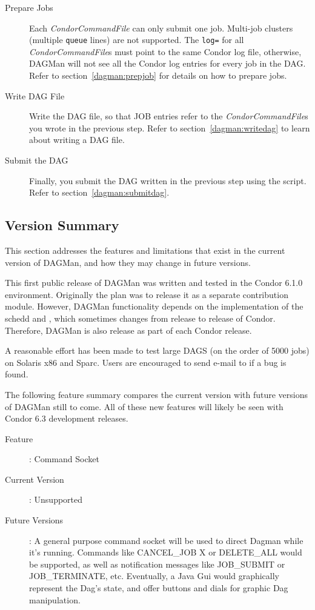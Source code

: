 \begin{description}

\item[Prepare Jobs] 
Each \textit{CondorCommandFile} can only submit one job.
Multi-job clusters (multiple \texttt{queue} lines) are not supported.
The \texttt{log=} for all \textit{CondorCommandFile}s must point to
the same Condor log file, otherwise, DAGMan will not see all the
Condor log entries for every job in the DAG.  
Refer to section~\ref{dagman:prepjob} for details on how to prepare
jobs.

\item[Write DAG File] Write the DAG file, so that JOB entries refer to the
\textit{CondorCommandFile}s you wrote in the previous step.  Refer to
section~\ref{dagman:writedag} to learn about writing a DAG file.

\item[Submit the DAG] Finally, you submit the DAG written in the previous step
using the  script.  Refer to
section~\ref{dagman:submitdag}.

\end{description}


\subsection{\label{dagman:version}Version Summary}

This section addresses the features and limitations that exist in the current
version of DAGMan, and how they may change in future versions.

This first public release of DAGMan was written and tested in the Condor 6.1.0
environment.  Originally the plan was to release it as a separate contribution
module.  However, DAGMan functionality depends on the implementation of the
schedd and , which sometimes changes from release to release of
Condor.  Therefore, DAGMan is also release as part of each Condor release.

A reasonable effort has been made to test large DAGS (on the order of 5000
jobs) on Solaris x86 and Sparc.  Users are encouraged to send e-mail to
 if a bug is found.

The following feature summary compares the current version with future
versions of DAGMan still to come.  All of these new features will likely be
seen with Condor 6.3 development releases.

\begin{description}
\item[Feature] : Command Socket
\item[Current Version] : Unsupported
\item[Future Versions] : A general purpose command socket will be used to
direct Dagman while it's running.  Commands like CANCEL\_JOB X or DELETE\_ALL
would be supported, as well as notification messages like JOB\_SUBMIT or
JOB\_TERMINATE, etc.  Eventually, a Java Gui would graphically represent the
Dag's state, and offer buttons and dials for graphic Dag manipulation.
\end{description}

